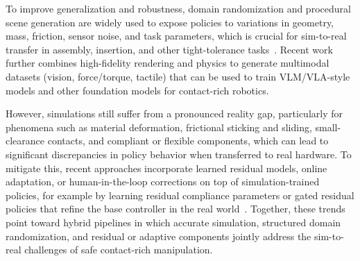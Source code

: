\documentclass[Afour,sageh,times]{template/sagej}
\begin{document}
To improve generalization and robustness, domain randomization and procedural scene generation are widely used to expose policies to variations in geometry, mass, friction, sensor noise, and task parameters, which is crucial for sim-to-real transfer in assembly, insertion, and other tight-tolerance tasks~\cite{37,139,145}. Recent work further combines high-fidelity rendering and physics to generate multimodal datasets (vision, force/torque, tactile) that can be used to train VLM/VLA-style models and other foundation models for contact-rich robotics.

However, simulations still suffer from a pronounced reality gap, particularly for phenomena such as material deformation, frictional sticking and sliding, small-clearance contacts, and compliant or flexible components, which can lead to significant discrepancies in policy behavior when transferred to real hardware. To mitigate this, recent approaches incorporate learned residual models, online adaptation, or human-in-the-loop corrections on top of simulation-trained policies, for example by learning residual compliance parameters or gated residual policies that refine the base controller in the real world~\cite{111,176}. Together, these trends point toward hybrid pipelines in which accurate simulation, structured domain randomization, and residual or adaptive components jointly address the sim-to-real challenges of safe contact-rich manipulation.
\end{document}
